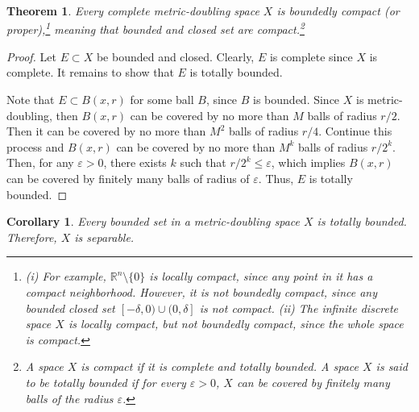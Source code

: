 \documentclass[11pt]{book}
\newtheorem{theorem}{Theorem}[chapter]
\newtheorem{corollary}{Corollary}[theorem]
\theoremstyle{definition}
\numberwithin{equation}{chapter}
\begin{document}
\medskip

\begin{theorem}
Every complete metric-doubling space $X$ is boundedly compact (or proper),\footnote{(i) For example, $\mathbb{R}^n \setminus \{0\}$ is locally compact, since any point in it has a compact neighborhood. However, it is not boundedly compact, since any bounded closed set $[-\delta,0)\cup(0,\delta]$ is not compact. (ii) The infinite discrete space $X$ is locally compact, but not 
boundedly compact, since the whole space is compact.} meaning that bounded and closed set are compact.\footnote{A space $X$ is compact if it is complete and totally bounded. A space $X$ is said to be totally bounded if for every $\varepsilon > 0$, $X$ can be covered by finitely many balls of the radius $\varepsilon$.}
\end{theorem}
\begin{proof}
Let $E \subset X$ be bounded and closed. Clearly, $E$ is complete since $X$ is complete. It remains to show that $E$ is totally bounded.

Note that $E \subset B(x,r)$ for some ball $B$, since $B$ is bounded. Since $X$ is metric-doubling, then $B(x,r)$ can be covered by no more than $M$ balls of radius $r/2$. Then it can be covered by no more than $M^2$ balls of radius $r/4$. Continue this process and $B(x,r)$ can be covered by no more than $M^k$ balls of radius $r/2^k$. Then, for any $\varepsilon > 0$, there exists $k$ such that $r/2^k \leq \varepsilon$, which implies $B(x,r)$ can be covered by finitely many balls of radius of $\varepsilon$. Thus, $E$ is totally bounded.
\end{proof}

\medskip

\begin{corollary}\label{coro_511}
Every bounded set in a metric-doubling space $X$ is totally bounded. Therefore, $X$ is separable.
\end{corollary}

\medskip
\end{document}
